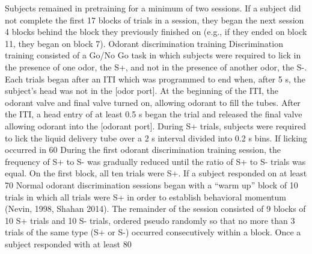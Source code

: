 Subjects remained in pretraining for a minimum of two sessions.  If a subject did not complete the first 17 blocks of trials in a session, they began the next session 4 blocks behind the block they previously finished on (e.g., if they ended on block 11, they began on block 7).
Odorant discrimination training
Discrimination training consisted of a Go/No Go task in which subjects were required to lick in the presence of one odor, the S+, and not in the presence of another odor, the S-.  Each trials began after an ITI which was programmed to end when, after 5 s, the subject’s head was not in the [odor port]. At the beginning of the ITI, the odorant valve and final valve turned on, allowing odorant to fill the tubes. After the ITI, a head entry of at least 0.5 s began the trial and released the final valve allowing odorant into the [odorant port]. During S+ trials, subjects were required to lick the liquid delivery tube over a 2 s interval divided into 0.2 s bins. If licking occurred in 60%
During the first odorant discrimination training session, the frequency of S+ to S- was gradually reduced until the ratio of S+ to S- trials was equal. On the first block, all ten trials were S+. If a subject responded on at least 70%
Normal odorant discrimination sessions began with a “warm up” block of 10 trials in which all trials were S+ in order to establish behavioral momentum (Nevin, 1998, Shahan 2014).  The remainder of the session consisted of 9 blocks of 10 S+ trials and 10 S- trials, ordered pseudo randomly so that no more than 3 trials of the same type (S+ or S-) occurred consecutively within a block. Once a subject responded with at least 80%

